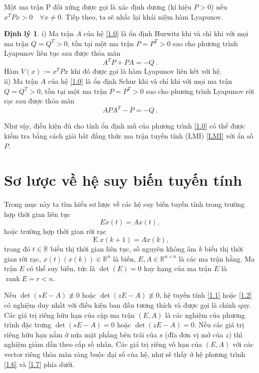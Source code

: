 \documentclass[12pt,a4paper]{report}
\theoremstyle{definition}
\newtheorem{dl}{Định lý}
\theoremstyle{definition}
\numberwithin{dl}{chapter}
\numberwithin{vd}{chapter}
\numberwithin{corollary}{chapter}
\numberwithin{lemma}{chapter}
\numberwithin{md}{chapter}
\numberwithin{dn}{chapter}
\numberwithin{cy}{chapter}
\numberwithin{nx}{chapter}
\begin{document}
Một ma trận P đối xứng được gọi là xác định dương (kí hiệu $P > 0$) nếu $x^TPx > 0\quad \forall x \neq 0.$ Tiếp theo, ta sẽ nhắc lại khái niệm hàm Lyapunov.

\begin{dl} 
i) Ma trận $A$ của hệ \eqref{1.0} là ổn định Hurwitz khi và chỉ khi với mọi ma trận $Q=Q^{T}>0$, tồn tại một ma trận $P=P^{T}>0$ sao cho phương trình Lyapunov liên tục sau được thỏa mãn
%
\begin{equation}\label{LMI}
A^{T} P+P A=-Q \ .
\end{equation}
Hàm $V(x):=x^{T} P x$ khi đó được gọi là hàm Lyapunov liên kết với hệ.\\
ii) Ma trận $A$ của hệ \eqref{1.0} là ổn định Schur khi và chỉ khi với mọi ma trận $Q=Q^{T}>0$, tồn tại một ma trận $P=P^{T}>0$ sao cho phương trình Lyapunov rời rạc sau được thỏa mãn
%
\begin{equation}\label{LMI}
A P A^{T} - P = - Q \ .
\end{equation}
\end{dl}

Như vậy, điều kiện đủ cho tính ổn định mũ của phương trình \eqref{1.0} có thể được kiểm tra bằng cách giải bất đẳng thức ma trận tuyến tính (LMI) \eqref{LMI} với ẩn số $P$.


\section{Sơ lược về hệ suy biến tuyến tính}
Trong mục này ta tìm hiểu sơ lược về các hệ suy biến tuyến tính trong trường hợp thời gian liên tục
\begin{equation}\label{1.1}
E\dot{x}(t)=A x(t),
\end{equation}
hoặc trường hợp thời gian rời rạc 
\begin{equation}\label{1.2}
\operatorname{E}x(k+1)=A x(k),
\end{equation}
%
trong đó $t \in \mathbb{R}$ biểu thị thời gian liên tục, số nguyên không âm $k$ biểu thị thời gian rời rạc, $x(t)(x(k)) \in \mathbb{R}^{n}$ là biến, $E, A \in \mathbb{R}^{n \times n}$ là các ma trận hằng. Ma trận $E$ có thể suy biến, tức là $\det(E)=0$ hay hạng của ma trận $E$ là $\operatorname{rank} E = r < n$.

Nếu $\det(sE-A) \not \equiv 0$ hoặc $\det(zE-A) \not \equiv 0$, hệ tuyến tính \eqref{1.1} hoặc \eqref{1.2} có nghiệm duy nhất với điều kiện ban đầu tương thích và được gọi là chính quy. Các giá trị riêng hữu hạn của cặp ma trận  $(E, A)$ là các nghiệm của phương trình đặc trưng $\det(sE-A)=0$ hoặc $\det(zE-A)=0$. Nếu các giá trị riêng hữu hạn nằm ở nửa mặt phẳng bên trái của $s$ (đĩa đơn vị mở của $z$) thì nghiệm giảm dần theo cấp số nhân. Các giá trị riêng vô hạn của  $(E, A)$ với các vector riêng thỏa mãn ràng buộc đại số của hệ, như sẽ thấy ở hệ phương trình \eqref{1.6} và \eqref{1.7} phía dưới.\\
\end{document}
